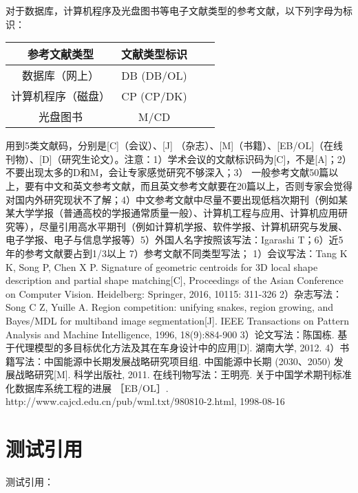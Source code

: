\documentclass[12pt]{zjutbook}
\begin{document}
对于数据库，计算机程序及光盘图书等电子文献类型的参考文献，以下列字母为标识：
\begin{table}[htp]
  \centering
  \begin{tabular}{cccc}
    \toprule
    \textbf{参考文献类型} & \textbf{文献类型标识} \\
    \midrule
    数据库（网上）         & DB (DB/OL)      \\
    计算机程序（磁盘）       & CP (CP/DK)      \\
    光盘图书            & M/CD            \\
    \bottomrule
  \end{tabular}
\end{table}

用到5类文献码，分别是[C]（会议）、[J] （杂志）、[M]（书籍）、[EB/OL]（在线刊物）、[D]（研究生论文）。注意：1）学术会议的文献标识码为[C]，不是[A]；2）不要出现太多的D和M，会让专家感觉研究不够深入；3） 一般参考文献50篇以上，要有中文和英文参考文献，而且英文参考文献要在20篇以上，否则专家会觉得对国内外研究现状不了解；4）中文参考文献中尽量不要出现低档次期刊（例如某某大学学报（普通高校的学报通常质量一般）、计算机工程与应用、计算机应用研究等），尽量引用高水平期刊（例如计算机学报、软件学报、计算机研究与发展、电子学报、电子与信息学报等）5）外国人名字按照该写法：Igarashi T；6）近5年的参考文献要占到1/3以上 7）参考文献不同类型写法；
1）会议写法：Tang K K, Song P, Chen X P. Signature of geometric centroids for 3D local shape description and partial shape matching[C], Proceedings of the Asian Conference on Computer Vision. Heidelberg: Springer, 2016, 10115: 311-326
2）杂志写法：Song C Z, Yuille A. Region competition: unifying snakes, region growing, and Bayes/MDL for multiband image segmentation[J]. IEEE Transactions on Pattern Analysis and Machine Intelligence, 1996, 18(9):884-900
3）论文写法：陈国栋. 基于代理模型的多目标优化方法及其在车身设计中的应用[D]. 湖南大学, 2012.
4）书籍写法：中国能源中长期发展战略研究项目组. 中国能源中长期 (2030、2050) 发展战略研究[M]. 科学出版社, 2011.
在线刊物写法：王明亮. 关于中国学术期刊标准化数据库系统工程的进展 ［EB/OL］. http://www.cajcd.edu.cn/pub/wml.txt/980810-2.html,  1998-08-16

\section{测试引用}
测试引用：
\cite{zhangkun1994}
\cite{zhukezhen1973}
\cite{dupont1974bone}
\cite{zhengkaiqing1987}
\cite{jiangxizhou1980}
\cite{jianduju1994}
\cite{merkt1995rotational}
\cite{mellinger1996laser}
\cite{bixon1996dynamics}
\cite{mahui1995}
\cite{carlson1981two}
\cite{taylor1983scanning}
\cite{taylor1981study}
\cite{shimizu1983laser}
\cite{atkinson1982experimental}
\cite{kusch1975perturbations}
\cite{guangxi1993} \\
\cite{huosini1989guwu}
\cite{wangfuzhi1865songlun}
\cite{zhaoyaodong1998xinshidai}
\cite{biaozhunhua2002tushu}
\cite{chubanzhuanye2004}
\cite{who1970factors}
\cite{peebles2001probability}
\cite{baishunong1998zhiwu}
\cite{weinstein1974pathogenic}
\cite{hanjiren1985lun}
\cite{dizhi1936dizhi}
\cite{tushuguan1957tushuguanxue}
\cite{aaas1883science}
\cite{fugang2000fengsha}
\cite{xiaoyu2001chubanye}
\cite{oclc2000about}
\cite{scitor2000project}
\end{document}
